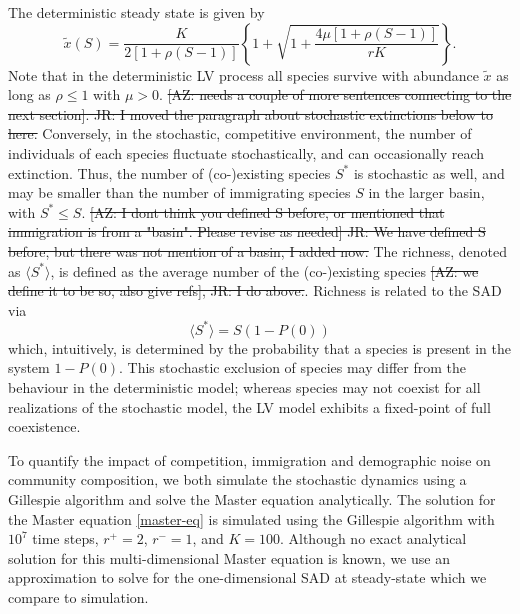\documentclass[9pt,twocolumn,twoside,lineno]{pnas-new}
\begin{document}
The deterministic steady state is given by
\begin{equation}
    \tilde{x}(S) = \frac{K}{2[1+\rho(S-1)]}\left\{1 +  \sqrt{1+\frac{4\mu[1+\rho(S -1)]}{r K}}\right\}.
    \label{eq:fixed-LV}
\end{equation}
Note that in the deterministic LV process all species survive with abundance $\tilde{x}$ as long as $\rho\leq 1$ with $\mu>0$.
\st{[AZ: needs a couple of more sentences connecting to the next section]. JR: I moved the paragraph about stochastic extinctions below to here.} 
Conversely, in the stochastic, competitive environment, the number of individuals of each species fluctuate stochastically, and can occasionally reach extinction. 
Thus, the number of (co-)existing species $S^*$ is stochastic as well, and may be smaller than the number of immigrating species $S$ in the larger basin, with $S^*\leq S$. \st{[AZ: I dont think you defined S before, or mentioned that immigration is from a "basin". Please revise as needed] JR: We have defined S before, but there was not mention of a basin, I added now.}
The richness, denoted as $\langle S^* \rangle $, is defined as the average number of the (co-)existing species \st{[AZ: we define it to be so, also give refs], JR: I do above.}.
Richness is related to the SAD  via
\begin{equation}
\label{eq:richness}
\langle S^* \rangle = S(1-P(0))
\end{equation}
which, intuitively, is determined by the probability that a species is present in the system $1-P(0)$.
This stochastic exclusion of species may differ from the behaviour in the deterministic model; whereas species may not coexist for all realizations of the stochastic model, the LV model exhibits a fixed-point of full coexistence.

To quantify the impact of competition, immigration and demographic noise on community composition, we both simulate the stochastic dynamics using a Gillespie algorithm and solve the Master equation analytically.
The solution for the Master equation \eqref{master-eq} is simulated using the Gillespie algorithm with $10^7$ time steps, $r^+=2$, $r^-=1$, and $K=100$.
Although no exact analytical solution for this multi-dimensional Master equation is known, we use an approximation to solve for the one-dimensional SAD at steady-state which we compare to simulation.
\end{document}
